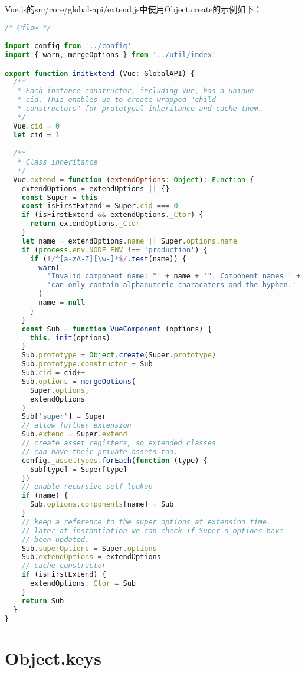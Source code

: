 Vue.js的src/core/global-api/extend.js中使用Object.create的示例如下：




\begin{lstlisting}[language=JavaScript]
/* @flow */

import config from '../config'
import { warn, mergeOptions } from '../util/index'

export function initExtend (Vue: GlobalAPI) {
  /**
   * Each instance constructor, including Vue, has a unique
   * cid. This enables us to create wrapped "child
   * constructors" for prototypal inheritance and cache them.
   */
  Vue.cid = 0
  let cid = 1

  /**
   * Class inheritance
   */
  Vue.extend = function (extendOptions: Object): Function {
    extendOptions = extendOptions || {}
    const Super = this
    const isFirstExtend = Super.cid === 0
    if (isFirstExtend && extendOptions._Ctor) {
      return extendOptions._Ctor
    }
    let name = extendOptions.name || Super.options.name
    if (process.env.NODE_ENV !== 'production') {
      if (!/^[a-zA-Z][\w-]*$/.test(name)) {
        warn(
          'Invalid component name: "' + name + '". Component names ' +
          'can only contain alphanumeric characaters and the hyphen.'
        )
        name = null
      }
    }
    const Sub = function VueComponent (options) {
      this._init(options)
    }
    Sub.prototype = Object.create(Super.prototype)
    Sub.prototype.constructor = Sub
    Sub.cid = cid++
    Sub.options = mergeOptions(
      Super.options,
      extendOptions
    )
    Sub['super'] = Super
    // allow further extension
    Sub.extend = Super.extend
    // create asset registers, so extended classes
    // can have their private assets too.
    config._assetTypes.forEach(function (type) {
      Sub[type] = Super[type]
    })
    // enable recursive self-lookup
    if (name) {
      Sub.options.components[name] = Sub
    }
    // keep a reference to the super options at extension time.
    // later at instantiation we can check if Super's options have
    // been updated.
    Sub.superOptions = Super.options
    Sub.extendOptions = extendOptions
    // cache constructor
    if (isFirstExtend) {
      extendOptions._Ctor = Sub
    }
    return Sub
  }
}
\end{lstlisting}


\section{Object.keys}

